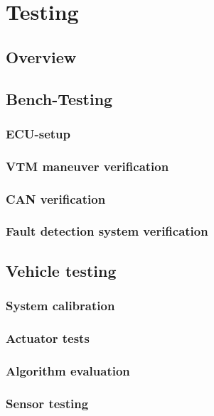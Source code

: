 \documentclass[ExampleMasters.tex]{subfiles}
\begin{document}
\clearpage
\chapter{Testing}
\label{chap:testing}

\section{Overview}



\section{Bench-Testing}
\label{sec:bench-testing}
\subsection{ECU-setup}
\subsection{VTM maneuver verification}
\subsection{CAN verification}


\subsection{Fault detection system verification}
\label{sec:fault_detect_test}


\section{Vehicle testing}
\label{sec:vehicle-testing}

\subsection{System calibration}
\subsection{Actuator tests}
\subsection{Algorithm evaluation}
\subsection{Sensor testing}
\end{document}
